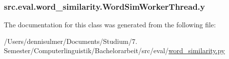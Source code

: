 \subsubsection[{\texorpdfstring{y}{y}}]{\setlength{\rightskip}{0pt plus 5cm}src.\+eval.\+word\+\_\+similarity.\+Word\+Sim\+Worker\+Thread.\+y}\hypertarget{classsrc_1_1eval_1_1word__similarity_1_1_word_sim_worker_thread_a0bd37d37430bab580530afb9c5769797}{}\label{classsrc_1_1eval_1_1word__similarity_1_1_word_sim_worker_thread_a0bd37d37430bab580530afb9c5769797}


The documentation for this class was generated from the following file\+:\begin{DoxyCompactItemize}
\item 
/\+Users/dennisulmer/\+Documents/\+Studium/7. Semester/\+Computerlinguistik/\+Bachelorarbeit/src/eval/\hyperlink{word__similarity_8py}{word\+\_\+similarity.\+py}\end{DoxyCompactItemize}
